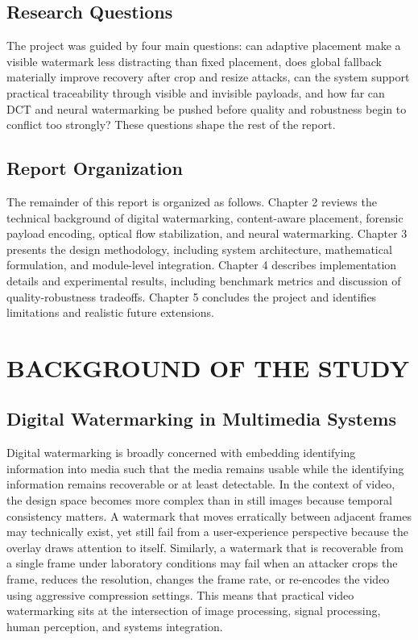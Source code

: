 \documentclass[12pt,oneside]{report}
\begin{document}
\section{Research Questions}
The project was guided by four main questions: can adaptive placement make a visible watermark less distracting than fixed placement, does global fallback materially improve recovery after crop and resize attacks, can the system support practical traceability through visible and invisible payloads, and how far can DCT and neural watermarking be pushed before quality and robustness begin to conflict too strongly? These questions shape the rest of the report.

\section{Report Organization}
The remainder of this report is organized as follows. Chapter 2 reviews the technical background of digital watermarking, content-aware placement, forensic payload encoding, optical flow stabilization, and neural watermarking. Chapter 3 presents the design methodology, including system architecture, mathematical formulation, and module-level integration. Chapter 4 describes implementation details and experimental results, including benchmark metrics and discussion of quality-robustness tradeoffs. Chapter 5 concludes the project and identifies limitations and realistic future extensions.

\clearpage
\chapter{BACKGROUND OF THE STUDY}
\section{Digital Watermarking in Multimedia Systems}
Digital watermarking is broadly concerned with embedding identifying information into media such that the media remains usable while the identifying information remains recoverable or at least detectable. In the context of video, the design space becomes more complex than in still images because temporal consistency matters. A watermark that moves erratically between adjacent frames may technically exist, yet still fail from a user-experience perspective because the overlay draws attention to itself. Similarly, a watermark that is recoverable from a single frame under laboratory conditions may fail when an attacker crops the frame, reduces the resolution, changes the frame rate, or re-encodes the video using aggressive compression settings. This means that practical video watermarking sits at the intersection of image processing, signal processing, human perception, and systems integration.
\end{document}
